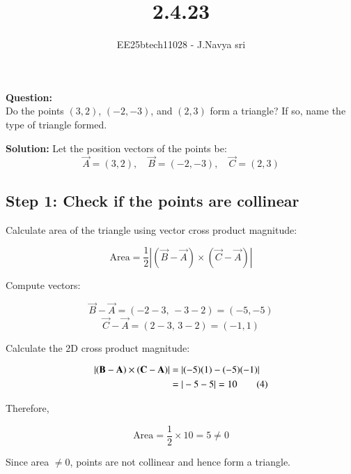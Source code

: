 \documentclass[journal]{IEEEtran}
\begin{document}

\vspace{3cm}

\title{2.4.23}
\author{EE25btech11028 - J.Navya sri}
{\let\newpage\relax\maketitle}




\textbf{Question:}\\

Do the points \( (3, 2) \), \( (-2, -3) \), and \( (2, 3) \) form a triangle? If so, name the type of triangle formed.

\vspace{0.5cm}
\textbf{Solution:} 
Let the position vectors of the points be:
\[
\vec{A} = (3, 2), \quad \vec{B} = (-2, -3), \quad \vec{C} = (2, 3)
\]

\subsection*{Step 1: Check if the points are collinear}

Calculate area of the triangle using vector cross product magnitude:

\begin{equation}
\text{Area} = \frac{1}{2} \left| (\vec{B} - \vec{A}) \times (\vec{C} - \vec{A}) \right| \tag{1}
\end{equation}

Compute vectors:

\[
\vec{B} - \vec{A} = (-2 - 3,\, -3 - 2) = (-5, -5) \tag{2}
\]
\[
\vec{C} - \vec{A} = (2 - 3,\, 3 - 2) = (-1, 1) \tag{3}
\]

Calculate the 2D cross product magnitude:

\begin{align}
|(\vec{B} - \vec{A}) \times (\vec{C} - \vec{A})| &= |(-5)(1) - (-5)(-1)| \notag \\
&= |-5 - 5| = 10 \tag{4}
\end{align}

Therefore,

\[
\text{Area} = \frac{1}{2} \times 10 = 5 \neq 0 \tag{5}
\]

Since area \(\neq 0\), points are not collinear and hence form a triangle.
\end{document}
